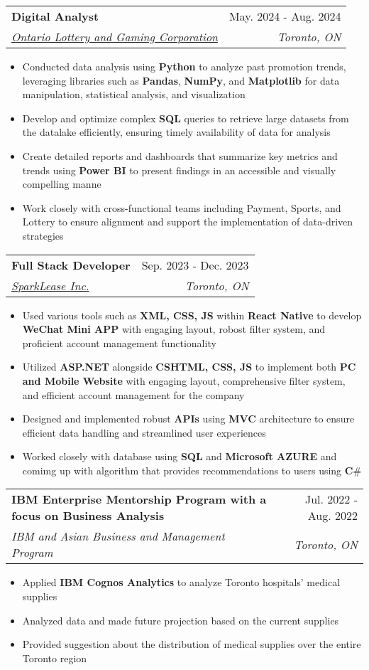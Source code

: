 \documentclass[letterpaper,11pt]{article}
\makeatletter
\newcommand{\resumeItem}[1]{
  \item\small{
    {#1 \vspace{-2pt}}
  }
}
\newcommand{\resumeSubheading}[4]{
  \vspace{-2pt}\item
    \begin{tabular*}{0.97\textwidth}[t]{l@{\extracolsep{\fill}}r}
      \textbf{#1} & #2 \\
      \textit{\small#3} & \textit{\small #4} \\
    \end{tabular*}\vspace{-7pt}
}
\newcommand{\resumeItemListStart}{\begin{itemize}}
\newcommand{\resumeItemListEnd}{\end{itemize}\vspace{-5pt}}
\makeatother
\begin{document}
    \resumeSubheading
      {Digital Analyst}{May. 2024 - Aug. 2024}
      {\href{https://www.olg.ca/en/home.html}{Ontario Lottery and Gaming Corporation}}{Toronto, ON}
      \resumeItemListStart
        \resumeItem{Conducted data analysis using \textbf{Python} to analyze past promotion trends, leveraging libraries such as \textbf{Pandas}, \textbf{NumPy}, and \textbf{Matplotlib} for data manipulation, statistical analysis, and visualization}
        \resumeItem{Develop and optimize complex \textbf{SQL} queries to retrieve large datasets from the datalake efficiently, ensuring timely availability of data for analysis}
        \resumeItem{Create detailed reports and dashboards that summarize key metrics and trends using \textbf{Power BI} to present findings in an accessible and visually compelling manne}
        \resumeItem{Work closely with cross-functional teams including Payment, Sports, and Lottery to ensure alignment and support the implementation of data-driven strategies}
      \resumeItemListEnd

    \resumeSubheading
      {Full Stack Developer}{Sep. 2023 - Dec. 2023}
      {\href{https://www.sparklease.com/en/Home/Index}{SparkLease Inc.}}{Toronto, ON}
      \resumeItemListStart
        \resumeItem{Used various tools such as \textbf{XML, CSS, JS} within \textbf{React Native} to develop \textbf{WeChat Mini APP} with engaging layout, robost filter system, and proficient account management functionality}
        \resumeItem{Utilized \textbf{ASP.NET} alongside \textbf{CSHTML, CSS, JS} to implement both \textbf{PC and Mobile Website} with engaging layout, comprehensive filter system, and efficient account management for the company}
        \resumeItem{Designed and implemented robust \textbf{APIs} using \textbf{MVC} architecture to ensure efficient data handling and streamlined user experiences}
        \resumeItem{Worked closely with database using \textbf{SQL} and \textbf{Microsoft AZURE} and comimg up with algorithm that provides recommendations to users using \textbf{C$\#$}}
      \resumeItemListEnd

    \resumeSubheading
      {IBM Enterprise Mentorship Program with a focus on Business Analysis}{Jul. 2022 - Aug. 2022}
      {IBM and Asian Business and Management Program}{Toronto, ON}
      \resumeItemListStart
        \resumeItem{Applied \textbf{IBM Cognos Analytics} to analyze Toronto hospitals' medical supplies}
        \resumeItem{Analyzed data and made future projection based on the current supplies}
        \resumeItem{Provided suggestion about the distribution of medical supplies over the entire Toronto region}
    \resumeItemListEnd
\end{document}
